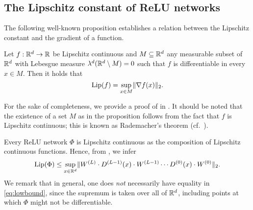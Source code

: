 \subsection{The Lipschitz constant of ReLU networks}
\label{subsec:lip}

The following well-known proposition establishes a relation between the Lipschitz constant
and the gradient of a function.

\begin{proposition}\label{prop:lipgrad}
  Let $f: \mathbb{R}^d \to \mathbb{R}$ be Lipschitz continuous and $M \subseteq \mathbb{R}^d$ any measurable subset
  of $\mathbb{R}^d$ with Lebesgue measure $\lambda^d (\mathbb{R}^d \setminus M) = 0$
  such that $f$ is differentiable in every $x \in M$.
  Then it holds that
  \begin{equation*}
    \operatorname{Lip}(f) = \underset{x \in M}{\sup} \Vert \nabla f (x) \Vert_2.
  \end{equation*}
\end{proposition} 

For the sake of completeness, we provide a proof of  in .
It should be noted that the existence of a set $M$
as in the proposition follows from the fact that $f$ is Lipschitz continuous;
this is known as Rademacher's theorem (cf.\ \cite[Section~3.1.2]{evans_measure_1992}). 

Every ReLU network $\Phi$ is Lipschitz continuous as the composition of Lipschitz continuous functions.
Hence, from , we infer 
\begin{equation}\label{eq:lowbound}
\operatorname{Lip}(\Phi)
  \leq \underset{x \in \mathbb{R}^d}{\sup}
         \Vert
           W^{(L)} \cdot D^{(L-1)}(x) \cdot W^{(L-1)} \cdots D^{(0)}(x)\cdot W^{(0)}
         \Vert_2.
\end{equation}
We remark that in general, one does \emph{not} necessarily have equality
in \eqref{eq:lowbound}, since the supremum is taken over all of $\mathbb{R}^d$,
including points at which $\Phi$ might not be differentiable.

